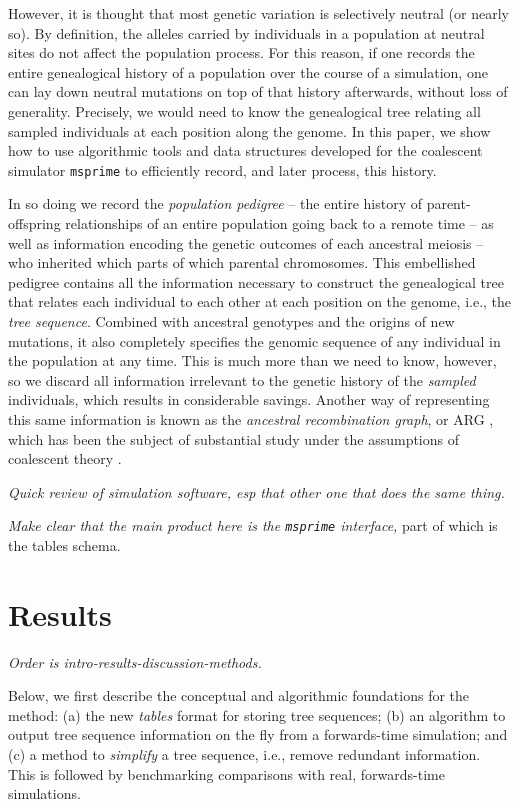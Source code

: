 \documentclass{article}
\newcommand{\msprime}{\texttt{msprime}}
\newcommand{\plr}[1]{{\em \color{blue} #1}}
\begin{document}
However, it is thought that most genetic variation is selectively neutral (or nearly so).
By definition, the alleles carried by individuals in a population at neutral sites
do not affect the population process.
For this reason, if one records the entire genealogical history of a population over the course of a simulation,
one can lay down neutral mutations on top of that history afterwards,
without loss of generality.
Precisely, we would need to know the genealogical tree relating all sampled individuals
at each position along the genome.
In this paper, we show how to use algorithmic tools and data structures developed for the 
coalescent simulator \msprime{}
to efficiently record, and later process, this history.

In so doing we record the \emph{population pedigree} --
the entire history of parent-offspring relationships of an entire population going back to a remote time --
as well as information encoding the genetic outcomes of each ancestral meiosis --
who inherited which parts of which parental chromosomes.
This embellished pedigree contains all the information necessary
to construct the genealogical tree that relates each individual to each other
at each position on the genome, i.e., the \emph{tree sequence}.
Combined with ancestral genotypes and the origins of new mutations,
it also completely specifies the genomic sequence of any individual in the population at any time.
This is much more than we need to know, however,
so we discard all information irrelevant to the genetic history
of the \emph{sampled} individuals,
which results in considerable savings.
Another way of representing this same information
is known as the \emph{ancestral recombination graph}, or {ARG} \citep{griffiths1997ancestral},
which has been the subject of substantial study
under the assumptions of coalescent theory \citep{wiuf1997number,wiuf1999ancestry,marjoram2006coalescent,wilton2015smc}.

\plr{Quick review of simulation software, esp that other one that does the same thing.}

\plr{Make clear that the main product here is the \msprime{} interface,}
part of which is the tables schema.


\section*{Results}

\plr{Order is intro-results-discussion-methods.}

Below, we first describe the conceptual and algorithmic foundations for the method:
(a) the new \emph{tables} format for storing tree sequences;
(b) an algorithm to output tree sequence information on the fly
    from a forwards-time simulation;
and (c) a method to \emph{simplify} a tree sequence, i.e., remove redundant information.
This is followed by benchmarking comparisons
with real, forwards-time simulations.
\end{document}
